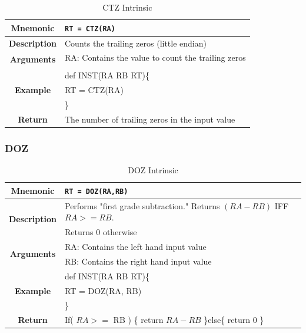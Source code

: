 \documentclass{article}
\begin{document}
\begin{table}[h]
\begin{center}
\caption{CTZ Intrinsic}
\vspace{0.125in}
\label{tab:CTZIntrinsic}
\begin{tabular}{|c|l|}
\hline
\textbf{Mnemonic} & \texttt{RT = CTZ(RA)}\\
\hline
\textbf{Description} & Counts the trailing zeros (little endian)\\
\hline
\multirow{2}{*}{\textbf{Arguments}} & RA: Contains the value to count the trailing zeros\\
                          			     & \\
\hline
\multirow{3}{*}{\textbf{Example}} & def INST(RA RB RT)\{\\
                          			  &   RT = CTZ(RA)\\
                                                    & \}\\
\hline
\textbf{Return} & The number of trailing zeros in the input value\\                                                    
\hline
\end{tabular}
\end{center}
\end{table}

\clearpage
\subsubsection{DOZ}
\label{sec:DOZ}

\begin{table}[h]
\begin{center}
\caption{DOZ Intrinsic}
\vspace{0.125in}
\label{tab:DOZIntrinsic}
\begin{tabular}{|c|l|}
\hline
\textbf{Mnemonic} & \texttt{RT = DOZ(RA,RB)}\\
\hline
\multirow{2}{*}{\textbf{Description}} & Performs "first grade subtraction."  Returns $(RA-RB)$ IFF $RA >= RB$.\\
			      			      & Returns 0 otherwise\\
\hline
\multirow{2}{*}{\textbf{Arguments}} & RA: Contains the left hand input value \\
                          			     & RB: Contains the right hand input value \\
\hline
\multirow{3}{*}{\textbf{Example}} & def INST(RA RB RT)\{\\
                          			  &   RT = DOZ(RA, RB)\\
                                                    & \}\\
\hline
\textbf{Return} & If( $RA >=$ RB ) \{ return $RA-RB$ \}else\{ return 0 \}\\                                                    
\hline
\end{tabular}
\end{center}
\end{table}
\end{document}
